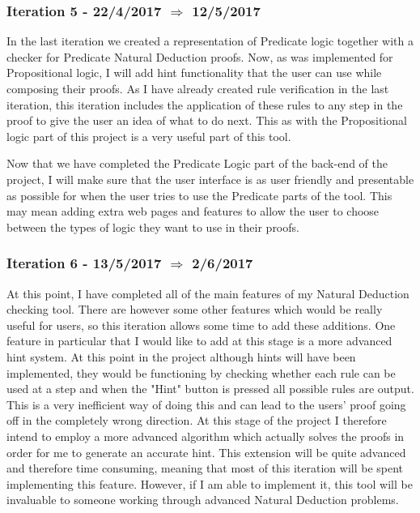 \subsubsection{Iteration 5 - 22/4/2017 $\Rightarrow$ 12/5/2017}

In the last iteration we created a representation of Predicate logic together with a checker for Predicate Natural Deduction proofs. Now, as was implemented for Propositional logic, I will add hint functionality that the user can use while composing their proofs. As I have already created rule verification in the last iteration, this iteration includes the application of these rules to any step in the proof to give the user an idea of what to do next. This as with the Propositional logic part of this project is a very useful part of this tool. 

Now that we have completed the Predicate Logic part of the back-end of the project, I will make sure that the user interface is as user friendly and presentable as possible for when the user tries to use the Predicate parts of the tool. This may mean adding extra web pages and features to allow the user to choose between the types of logic they want to use in their proofs.

\subsubsection{Iteration 6 - 13/5/2017 $\Rightarrow$ 2/6/2017}

At this point, I have completed all of the main features of my Natural Deduction checking tool. There are however some other features which would be really useful for users, so this iteration allows some time to add these additions. One feature in particular that I would like to add at this stage is a more advanced hint system. At this point in the project although hints will have been implemented, they would be functioning by checking whether each rule can be used at a step and when the "Hint" button is pressed all possible rules are output. This is a very inefficient way of doing this and can lead to the users' proof going off in the completely wrong direction. At this stage of the project I therefore intend to employ a more advanced algorithm which actually solves the proofs in order for me to generate an accurate hint. This extension will be quite advanced and therefore time consuming, meaning that most of this iteration will be spent implementing this feature. However, if I am able to implement it, this tool will be invaluable to someone working through advanced Natural Deduction problems.


